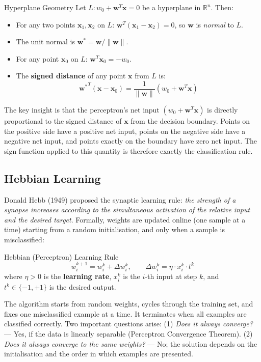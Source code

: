 \documentclass[11pt,a4paper]{article}
\newcommand{\term}[1]{\textcolor{DefGreen}{\textbf{#1}}\index{#1}}
\begin{document}
\begin{thmbox}{Hyperplane Geometry}
Let $L: w_0 + \mathbf{w}^T\mathbf{x} = 0$ be a hyperplane in $\mathbb{R}^n$. Then:
\begin{itemize}
  \item For any two points $\mathbf{x}_1, \mathbf{x}_2$ on $L$: $\mathbf{w}^T(\mathbf{x}_1 - \mathbf{x}_2) = 0$, so $\mathbf{w}$ is \emph{normal} to $L$.
  \item The unit normal is $\mathbf{w}^* = \mathbf{w}/\|\mathbf{w}\|$.
  \item For any point $\mathbf{x}_0$ on $L$: $\mathbf{w}^T\mathbf{x}_0 = -w_0$.
  \item The \term{signed distance} of any point $\mathbf{x}$ from $L$ is:
  \[
  {\mathbf{w}^*}^T(\mathbf{x} - \mathbf{x}_0) = \frac{1}{\|\mathbf{w}\|}(w_0 + \mathbf{w}^T\mathbf{x})
  \]
\end{itemize}
\end{thmbox}

The key insight is that the perceptron's net input $(w_0 + \mathbf{w}^T\mathbf{x})$ is directly proportional to the signed distance of $\mathbf{x}$ from the decision boundary. Points on the positive side have a positive net input, points on the negative side have a negative net input, and points exactly on the boundary have zero net input. The sign function applied to this quantity is therefore exactly the classification rule.

\subsection{Hebbian Learning}

Donald Hebb (1949) proposed the synaptic learning rule: \emph{the strength of a synapse increases according to the simultaneous activation of the relative input and the desired target}. Formally, weights are updated online (one sample at a time) starting from a random initialisation, and only when a sample is misclassified:

\begin{defbox}{Hebbian (Perceptron) Learning Rule}
\[
w_i^{k+1} = w_i^k + \Delta w_i^k, \qquad \Delta w_i^k = \eta \cdot x_i^k \cdot t^k
\]
where $\eta > 0$ is the \term{learning rate}, $x_i^k$ is the $i$-th input at step $k$, and $t^k \in \{-1, +1\}$ is the desired output.
\end{defbox}

\begin{notebox}
The algorithm starts from random weights, cycles through the training set, and fixes one misclassified example at a time. It terminates when all examples are classified correctly. Two important questions arise: (1) \emph{Does it always converge?} — Yes, if the data is linearly separable (Perceptron Convergence Theorem). (2) \emph{Does it always converge to the same weights?} — No; the solution depends on the initialisation and the order in which examples are presented.
\end{notebox}
\end{document}
